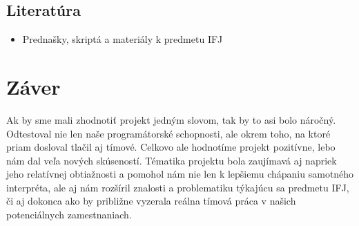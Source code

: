 \documentclass[12pt, a4paper]{article}
\begin{document}
        \subsection{Literatúra}
        \begin{itemize}
            \item Prednašky, skriptá a materiály k predmetu IFJ
        \end{itemize}
        \newpage
    \section{Záver}
    Ak by sme mali zhodnotiť projekt jedným slovom, tak by to asi bolo náročný. Odtestoval nie len naše programátorské schopnosti, ale okrem toho, na ktoré priam dosloval tlačil aj tímové. Celkovo ale hodnotíme projekt pozitívne, lebo nám dal veľa nových skúseností. Tématika projektu bola zaujímavá aj napriek jeho relatívnej obtiažnosti a pomohol nám nie len k lepšiemu chápaniu samotného interpréta, ale aj nám rozšíril znalosti a problematiku týkajúcu sa predmetu IFJ, či aj dokonca ako by približne vyzerala reálna tímová práca v našich potenciálnych zamestnaniach.
    
\end{document}

